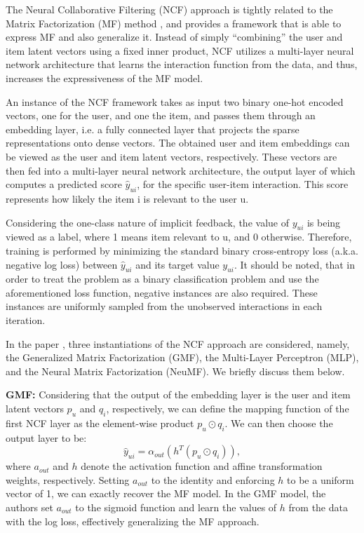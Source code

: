 
The Neural Collaborative Filtering (NCF) approach \cite{he2017neural} is tightly related to the Matrix Factorization (MF) method \cite{koren2009matrix}, and provides a framework that is able to express MF and also generalize it.
Instead of simply ``combining'' the user and item latent vectors using a fixed inner product, NCF utilizes a multi-layer neural network architecture that learns the interaction function from the data, and thus, increases the expressiveness of the MF model.

An instance of the NCF framework takes as input two binary one-hot encoded vectors, one for the user, and one the item, and passes them through an embedding layer, i.e. a fully connected layer that projects the sparse representations onto dense vectors.
The obtained user and item embeddings can be viewed as the user and item latent vectors, respectively.
These vectors are then fed into a multi-layer neural network architecture, the output layer of which computes a predicted score $\hat{y}_{ui}$, for the specific user-item interaction.
This score represents how likely the item i is relevant to the user u.

Considering the one-class nature of implicit feedback, the value of $y_{ui}$ is being viewed as a label, where 1 means item relevant to u, and 0 otherwise.
Therefore, training is performed by minimizing the standard binary cross-entropy loss (a.k.a. negative log loss) between $\hat{y}_{ui}$ and its target value $y_{ui}$.
It should be noted, that in order to treat the problem as a binary classification problem and use the aforementioned loss function, negative instances are also required.
These instances are uniformly sampled from the unobserved interactions in each iteration.

In the paper \cite{he2017neural}, three instantiations of the NCF approach are considered, namely, the Generalized Matrix Factorization (GMF), the Multi-Layer Perceptron (MLP), and the Neural Matrix Factorization (NeuMF).
We briefly discuss them below.

\textbf{GMF:} Considering that the output of the embedding layer is the user and item latent vectors $p_u$ and $q_i$, respectively, we can define the mapping function of the first NCF layer as the element-wise product $p_u \odot q_i$.
We can then choose the output layer to be:
\begin{equation}
    \hat{y}_{ui} = \alpha_{out}(h^T(p_u \odot q_i)),
\end{equation}
where $a_{out}$ and $h$ denote the activation function and affine transformation weights, respectively.
Setting $a_{out}$ to the identity and enforcing $h$ to be a uniform vector of 1, we can exactly recover the MF model.
In the GMF model, the authors set $a_{out}$ to the sigmoid function and learn the values of $h$ from the data with the log loss, effectively generalizing the MF approach.

